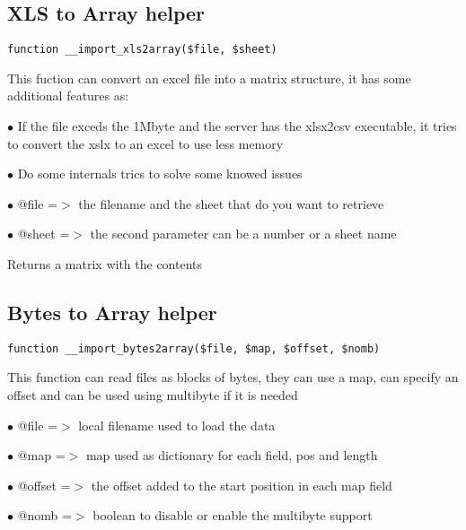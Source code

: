 \documentclass[a4paper]{book}
\begin{document}
\hypertarget{toc166}{}
\subsection{XLS to Array helper}

\begin{lstlisting}
function __import_xls2array($file, $sheet)
\end{lstlisting}

This fuction can convert an excel file into a matrix structure, it has some additional features as:

\begin{compactitem}
\item[\color{myblue}$\bullet$] If the file exceds the 1Mbyte and the server has the xlsx2csv executable, it tries to convert the xslx
  to an excel to use less memory
\item[\color{myblue}$\bullet$] Do some internals trics to solve some knowed issues
\end{compactitem}

\begin{compactitem}
\item[\color{myblue}$\bullet$] @file  =$>$ the filename and the sheet that do you want to retrieve
\item[\color{myblue}$\bullet$] @sheet =$>$ the second parameter can be a number or a sheet name
\end{compactitem}

Returns a matrix with the contents

\hypertarget{toc167}{}
\subsection{Bytes to Array helper}

\begin{lstlisting}
function __import_bytes2array($file, $map, $offset, $nomb)
\end{lstlisting}

This function can read files as blocks of bytes, they can use a map, can specify
an offset and can be used using multibyte if it is needed

\begin{compactitem}
\item[\color{myblue}$\bullet$] @file   =$>$ local filename used to load the data
\item[\color{myblue}$\bullet$] @map    =$>$ map used as dictionary for each field, pos and length
\item[\color{myblue}$\bullet$] @offset =$>$ the offset added to the start position in each map field
\item[\color{myblue}$\bullet$] @nomb   =$>$ boolean to disable or enable the multibyte support
\end{compactitem}
\end{document}
